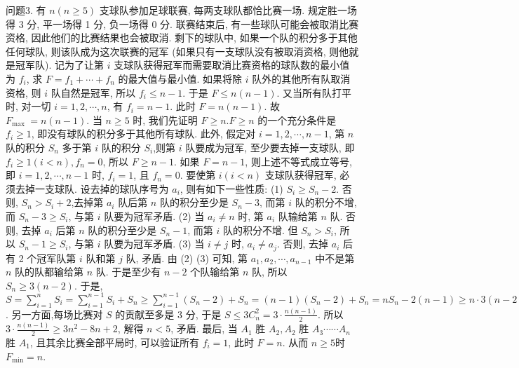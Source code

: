 问题3. 有 $n(n \geqslant 5)$ 支球队参加足球联赛, 每两支球队都恰比赛一场.
规定胜一场得 3 分, 平一场得 1 分, 负一场得 0 分.
联赛结束后, 有一些球队可能会被取消比赛资格, 因此他们的比赛结果也会被取消.
剩下的球队中, 如果一个队的积分多于其他任何球队, 则该队成为这次联赛的冠军 (如果只有一支球队没有被取消资格, 则他就是冠军队). 记为了让第 $i$ 支球队获得冠军而需要取消比赛资格的球队数的最小值为 $f_i$, 求 $F=f_1+\cdots+f_n$ 的最大值与最小值.
如果将除 $i$ 队外的其他所有队取消资格, 则 $i$ 队自然是冠军, 所以 $f_i \leqslant n-1$. 于是 $F \leqslant n(n-1)$. 又当所有队打平时, 对一切 $i=1,2, \cdots, n$, 有 $f_i=n-1$. 此时 $F=n(n-1)$. 故 $F_{\text {max }}=n(n-1)$. 当 $n \geqslant 5$ 时, 我们先证明 $F \geqslant n . F \geqslant n$ 的一个充分条件是 $f_i \geqslant 1$, 即没有球队的积分多于其他所有球队.
此外, 假定对 $i=1,2, \cdots, n-1$, 第 $n$ 队的积分 $S_n$ 多于第 $i$ 队的积分 $S_i$,则第 $i$ 队要成为冠军, 至少要去掉一支球队, 即 $f_i \geqslant 1(i<n), f_n=0$, 所以 $F \geqslant n-1$. 如果 $F=n-1$, 则上述不等式成立等号, 即 $i=1,2, \cdots, n-1$ 时, $f_i=1$, 且 $f_n=0$. 要使第 $i(i<n)$ 支球队获得冠军, 必须去掉一支球队.
设去掉的球队序号为 $a_i$, 则有如下一些性质: (1) $S_i \geqslant S_n-2$. 否则, $S_n>S_i+2$,去掉第 $a_i$ 队后第 $n$ 队的积分至少是 $S_n-3$, 而第 $i$ 队的积分不增, 而 $S_n-3 \geqslant S_i$, 与第 $i$ 队要为冠军矛盾.
(2) 当 $a_i \neq n$ 时, 第 $a_i$ 队输给第 $n$ 队.
否则, 去掉 $a_i$ 后第 $n$ 队的积分至少是 $S_n-1$, 而第 $i$ 队的积分不增.
但 $S_n>S_i$, 所以 $S_n- 1 \geqslant S_i$, 与第 $i$ 队要为冠军矛盾.
(3) 当 $i \neq j$ 时, $a_i \neq a_j$. 否则, 去掉 $a_i$ 后有 2 个冠军队第 $i$ 队和第 $j$ 队, 矛盾.
由 (2) (3) 可知, 第 $a_1, a_2, \cdots, a_{n-1}$ 中不是第 $n$ 队的队都输给第 $n$ 队.
于是至少有 $n-2$ 个队输给第 $n$ 队, 所以 $S_n \geqslant 3(n-2)$. 
于是, $S=\sum_{i=1}^n S_i=\sum_{i=1}^{n-1} S_i+S_n \geqslant \sum_{i=1}^{n-1}\left(S_n-2\right)+S_n=(n-1)\left(S_n-2\right)+ S_n=n S_n-2(n-1) \geqslant n \cdot 3(n-2)-2(n-1)=3 n^2-8 n+2$. 另一方面,每场比赛对 $S$ 的贡献至多是 3 分, 于是 $S \leqslant 3 C_n^2=3 \cdot \frac{n(n-1)}{2}$. 所以 $3 \cdot \frac{n(n-1)}{2} \geqslant 3 n^2-8 n+2$, 解得 $n<5$, 矛盾.
最后, 当 $A_1$ 胜 $A_2, A_2$ 胜 $A_3 \cdots \cdots A_n$胜 $A_1$, 且其余比赛全部平局时, 可以验证所有 $f_i=1$, 此时 $F=n$. 从而 $n \geqslant 5$时 $F_{\min }=n$.


